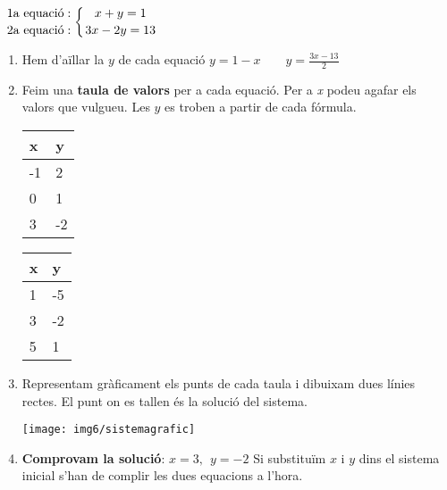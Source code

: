 \begin{theorybox}
	\begin{minipage}{0.4\textwidth}
		\centering
\end{minipage}
	 \begin{minipage}{0.6\textwidth}
	 	\centering
	 	$\genfrac{}{}{0pt}{0}{\text{  1a  equaci\'o}:}{\text{  2a  equaci\'o}:} \left\{\genfrac{}{}{0pt}{0}{x+y=1}{3x-2y=13}\right.$
	 	
	 \end{minipage}
	
	\begin{enumerate}
		\item  Hem d'a\"illar la $y$ de cada equaci\'o  
				$    y=1-x  \quad\quad	y=\frac{3x-13}{2}  $
				
		\item 	 Feim una \textbf{taula de valors} per a cada equaci\'o. Per a \textit{x} podeu agafar els valors que vulgueu. Les $y$ es troben a partir de cada f\'ormula.
				\begin{center}
			\begin{tabular}{p{1.201cm}|p{1.201cm}}
			  x & y \\ \hline
			  -1 & 2 \\
			0 & 1 \\
			3 &	-2 \\  
			\end{tabular}
		\quad\quad\quad\quad
		\begin{tabular}{p{1.201cm}|p{1.201cm}}
		x & y \\ \hline
		1 & -5 \\
		3 & -2 \\
		5 &	1 \\  
	\end{tabular}
		\end{center}
		
		\item  Representam gràficament els punts de cada taula i dibuixam dues línies rectes. El punt on es tallen és la solució del sistema.
	\begin{center}
	  \texttt{[image: img6/sistemagrafic]}
	\end{center}
	 
	 
	\item	\textbf{ Comprovam la soluci\'o}: $\boxed{x=3,\ \ y=-2}$  Si substitu\"im $x$ i $y$ dins el sistema inicial s'han de complir les dues equacions a l'hora.
		
	\end{enumerate}	
	
\end{theorybox}

